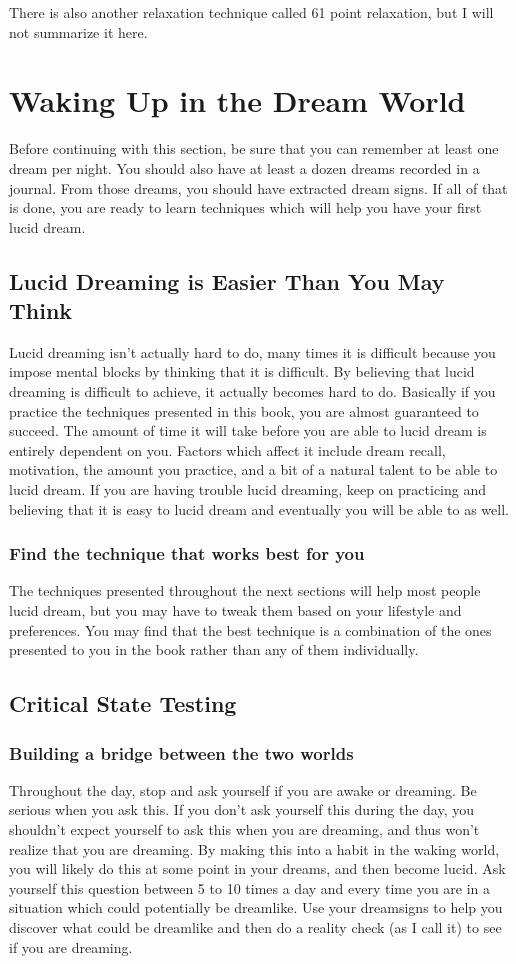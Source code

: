 \documentclass{article}
\begin{document}
\bigskip\noindent There is also another relaxation technique called 61 point relaxation, but I will not summarize it here.

\section{Waking Up in the Dream World}
Before continuing with this section, be sure that you can remember at least one dream per night. You should also have at least a dozen dreams recorded in a journal. From those dreams, you should have extracted dream signs. If all of that is done, you are ready to learn techniques which will help you have your first lucid dream.

\subsection{Lucid Dreaming is Easier Than You May Think}
Lucid dreaming isn't actually hard to do, many times it is difficult because you impose mental blocks by thinking that it is difficult. By believing that lucid dreaming is difficult to achieve, it actually becomes hard to do. Basically if you practice the techniques presented in this book, you are almost guaranteed to succeed. The amount of time it will take before you are able to lucid dream is entirely dependent on you. Factors which affect it include dream recall, motivation, the amount you practice, and a bit of a natural talent to be able to lucid dream. If you are having trouble lucid dreaming, keep on practicing and believing that it is easy to lucid dream and eventually you will be able to as well.

\subsubsection{Find the technique that works best for you}
The techniques presented throughout the next sections will help most people lucid dream, but you may have to tweak them based on your lifestyle and preferences. You may find that the best technique is a combination of the ones presented to you in the book rather than any of them individually.

\subsection{Critical State Testing}
\subsubsection{Building a bridge between the two worlds}
Throughout the day, stop and ask yourself if you are awake or dreaming. Be serious when you ask this. If you don't ask yourself this during the day, you shouldn't expect yourself to ask this when you are dreaming, and thus won't realize that you are dreaming. By making this into a habit in the waking world, you will likely do this at some point in your dreams, and then become lucid. Ask yourself this question between 5 to 10 times a day and every time you are in a situation which could potentially be dreamlike. Use your dreamsigns to help you discover what could be dreamlike and then do a reality check (as I call it) to see if you are dreaming.
\end{document}

